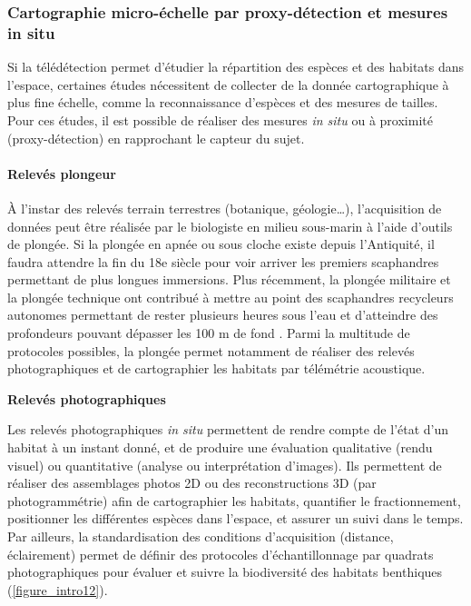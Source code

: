 \setlength{\fboxsep}{5pt}
\setlength{\fboxrule}{0.6pt}
\noindent{}

\subsubsection{Cartographie micro-échelle par proxy-détection et mesures in situ}\label{intro.2.2.2}

Si la télédétection permet d’étudier la répartition des espèces et des habitats dans l’espace, certaines études nécessitent de collecter de la donnée cartographique à plus fine échelle, comme la reconnaissance d’espèces et des mesures de tailles. Pour ces études, il est possible de réaliser des mesures \textit{in situ} ou à proximité (proxy-détection) en rapprochant le capteur du sujet.

\newpage

\paragraph{Relevés plongeur}

À l’instar des relevés terrain terrestres (botanique, géologie…), l’acquisition de données peut être réalisée par le biologiste en milieu sous-marin à l’aide d’outils de plongée. Si la plongée en apnée ou sous cloche existe depuis l’Antiquité, il faudra attendre la fin du 18e siècle pour voir arriver les premiers scaphandres permettant de plus longues immersions. Plus récemment, la plongée militaire et la plongée technique ont contribué à mettre au point des scaphandres recycleurs autonomes permettant de rester plusieurs heures sous l’eau et d’atteindre des profondeurs pouvant dépasser les 100 m de fond \citep{sieber_review_2010}. Parmi la multitude de protocoles possibles, la plongée permet notamment de réaliser des relevés photographiques et de cartographier les habitats par télémétrie acoustique.

\noindent\textbf{Relevés photographiques}

Les relevés photographiques \textit{in situ} permettent de rendre compte de l’état d’un habitat à un instant donné, et de produire une évaluation qualitative (rendu visuel) ou quantitative (analyse ou interprétation d’images). Ils permettent de réaliser des assemblages photos 2D ou des reconstructions 3D (par photogrammétrie) afin de cartographier les habitats, quantifier le fractionnement, positionner les différentes espèces dans l’espace, et assurer un suivi dans le temps. Par ailleurs, la standardisation des conditions d’acquisition (distance, éclairement) permet de définir des protocoles d’échantillonnage par quadrats photographiques pour évaluer et suivre la biodiversité des habitats benthiques \citep{deter_rapid_2012} (\autoref{figure_intro12}).

